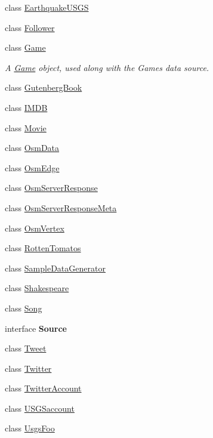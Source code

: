 \begin{DoxyCompactItemize}
\item 
class \mbox{\hyperlink{classbridges_1_1data__src__dependent_1_1_earthquake_u_s_g_s}{Earthquake\+U\+S\+GS}}
\item 
class \mbox{\hyperlink{classbridges_1_1data__src__dependent_1_1_follower}{Follower}}
\item 
class \mbox{\hyperlink{classbridges_1_1data__src__dependent_1_1_game}{Game}}
\begin{DoxyCompactList}\small\item\em A \mbox{\hyperlink{classbridges_1_1data__src__dependent_1_1_game}{Game}} object, used along with the Games data source. \end{DoxyCompactList}\item 
class \mbox{\hyperlink{classbridges_1_1data__src__dependent_1_1_gutenberg_book}{Gutenberg\+Book}}
\item 
class \mbox{\hyperlink{classbridges_1_1data__src__dependent_1_1_i_m_d_b}{I\+M\+DB}}
\item 
class \mbox{\hyperlink{classbridges_1_1data__src__dependent_1_1_movie}{Movie}}
\item 
class \mbox{\hyperlink{classbridges_1_1data__src__dependent_1_1_osm_data}{Osm\+Data}}
\item 
class \mbox{\hyperlink{classbridges_1_1data__src__dependent_1_1_osm_edge}{Osm\+Edge}}
\item 
class \mbox{\hyperlink{classbridges_1_1data__src__dependent_1_1_osm_server_response}{Osm\+Server\+Response}}
\item 
class \mbox{\hyperlink{classbridges_1_1data__src__dependent_1_1_osm_server_response_meta}{Osm\+Server\+Response\+Meta}}
\item 
class \mbox{\hyperlink{classbridges_1_1data__src__dependent_1_1_osm_vertex}{Osm\+Vertex}}
\item 
class \mbox{\hyperlink{classbridges_1_1data__src__dependent_1_1_rotten_tomatos}{Rotten\+Tomatos}}
\item 
class \mbox{\hyperlink{classbridges_1_1data__src__dependent_1_1_sample_data_generator}{Sample\+Data\+Generator}}
\item 
class \mbox{\hyperlink{classbridges_1_1data__src__dependent_1_1_shakespeare}{Shakespeare}}
\item 
class \mbox{\hyperlink{classbridges_1_1data__src__dependent_1_1_song}{Song}}
\item 
interface {\bfseries Source}
\item 
class \mbox{\hyperlink{classbridges_1_1data__src__dependent_1_1_tweet}{Tweet}}
\item 
class \mbox{\hyperlink{classbridges_1_1data__src__dependent_1_1_twitter}{Twitter}}
\item 
class \mbox{\hyperlink{classbridges_1_1data__src__dependent_1_1_twitter_account}{Twitter\+Account}}
\item 
class \mbox{\hyperlink{classbridges_1_1data__src__dependent_1_1_u_s_g_saccount}{U\+S\+G\+Saccount}}
\item 
class \mbox{\hyperlink{classbridges_1_1data__src__dependent_1_1_usgs_foo}{Usgs\+Foo}}
\end{DoxyCompactItemize}
